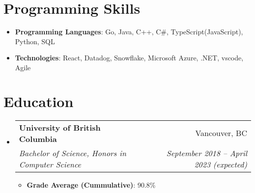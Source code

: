 \documentclass[letterpaper,11pt]{article}
\makeatletter
\newcommand{\resumeItem}[2]{
  \item{
    \textbf{#1}{: #2 \vspace{-2pt}}
  }
}
\newcommand{\resumeSubheading}[4]{
  \vspace{-1pt}\item
    \begin{tabular*}{0.97\textwidth}{@{}l@{\extracolsep{\fill}}r@{}}
      \textbf{#1} & #2 \\
      \textit{#3} & \textit{ #4} \\
    \end{tabular*}\vspace{-5pt}
}
\newcommand{\resumeSubItem}[2]{\resumeItem{#1}{#2}\vspace{-4pt}}
\newcommand{\resumeSubHeadingListStart}{\begin{itemize}[leftmargin=*]}
\newcommand{\resumeSubHeadingListEnd}{\end{itemize}}
\newcommand{\resumeItemListStart}{\begin{itemize}}
\newcommand{\resumeItemListEnd}{\end{itemize}\vspace{-5pt}}
\makeatother
\begin{document}
  


%


\section{Programming Skills}
\resumeSubHeadingListStart
  \resumeSubItem{Programming Languages}
    {Go, Java, C++, C\#, TypeScript(JavaScript), Python, SQL} \\
  \resumeSubItem{Technologies}
    {React, Datadog, Snowflake, Microsoft Azure, .NET, vscode, Agile} \\
\resumeSubHeadingListEnd

\section{Education}
  \resumeSubHeadingListStart
    \resumeSubheading
      {University of British Columbia}{Vancouver, BC}
      {Bachelor of Science, Honors in Computer Science}{September 2018 -- April 2023 (expected)}
      \resumeItemListStart
          \resumeItem{Grade Average (Cummulative)} {90.8\%}
      \resumeItemListEnd
  \resumeSubHeadingListEnd
\end{document}
